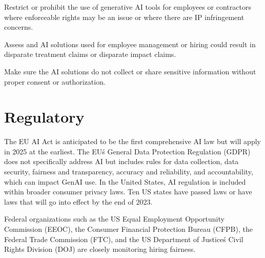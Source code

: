 \begin{minipage}{\linewidth}
\begin{checklist}
  \item Restrict or prohibit the use of generative AI tools for employees or contractors where enforceable rights may be an issue or where there are IP infringement concerns.
  \item Assess and AI solutions used for employee management or hiring could result in disparate treatment claims or disparate impact claims.
  \item Make sure the AI solutions do not collect or share sensitive information without proper consent or authorization.
\end{checklist}
\end{minipage}

\clearpage
\section{Regulatory}
The EU AI Act is anticipated to be the first comprehensive AI law but will
apply in 2025 at the earliest. The EU\'s General Data Protection Regulation
(GDPR) does not specifically address AI but includes rules for data collection,
data security, fairness and transparency, accuracy and reliability, and
accountability, which can impact GenAI use. In the United States, AI regulation
is included within broader consumer privacy laws. Ten US states have passed
laws or have laws that will go into effect by the end of 2023.

Federal organizations such as the US Equal Employment Opportunity Commission
(EEOC), the Consumer Financial Protection Bureau (CFPB), the Federal Trade
Commission (FTC), and the US Department of Justice\'s Civil Rights Division
(DOJ) are closely monitoring hiring fairness.

